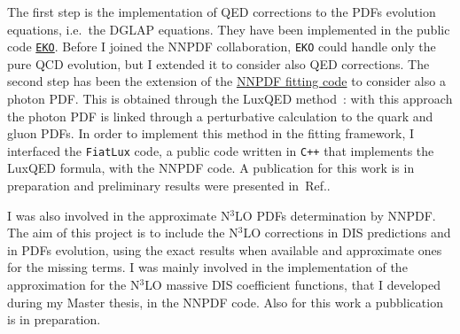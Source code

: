 \documentclass[11pt,a4paper]{moderncv}        %
\begin{document}
The first step is the implementation of QED corrections to the PDFs evolution equations, i.e.\ the DGLAP equations.
They have been implemented in the public code \href{https://github.com/NNPDF/eko}{\texttt{EKO}}.
Before I joined the NNPDF collaboration, \texttt{EKO} could handle only the pure QCD evolution, but I extended it to consider also QED corrections.
%
The second step has been the extension of the \href{https://github.com/NNPDF/nnpdf}{NNPDF fitting code} to consider also
a photon PDF.
This is obtained through the LuxQED method~\cite{Manohar:2016nzj, Manohar:2017eqh}: with this approach the photon PDF is linked through
a perturbative calculation to the quark and gluon PDFs.
In order to implement this method in the fitting framework, I interfaced the \texttt{FiatLux} code, a public code written in \texttt{C++} that implements the LuxQED formula, with the NNPDF code.
A publication for this work is in preparation and preliminary results were presented in~Ref.\cite{LAURENTI2023}.

I was also involved in the approximate N$^3$LO PDFs determination by NNPDF.
The aim of this project is to include the N$^3$LO corrections in DIS predictions and in PDFs evolution,
using the exact results when available and approximate ones for the missing terms.
I was mainly involved in the implementation of the approximation for the N$^3$LO massive DIS coefficient functions, that I developed
during my Master thesis, in the NNPDF code.
Also for this work a pubblication is in preparation.
\end{document}
